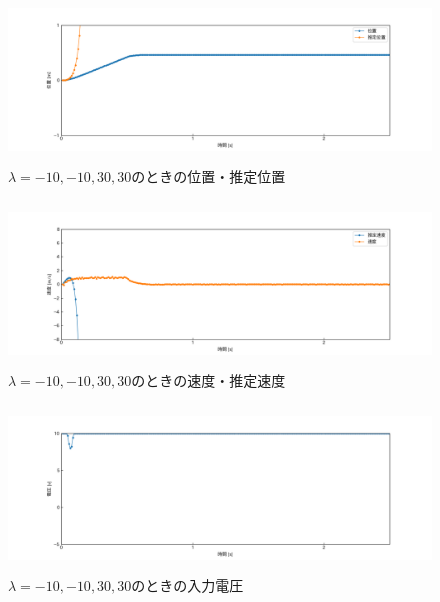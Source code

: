 \documentclass[12pt]{jsarticle}
\begin{document}
\begin{figure}[H]
  \begin{center}
    \includegraphics[clip,width=13.0cm, height=4.4cm]{../img/Exp9-1.png}
    \caption{$\lambda=-10, -10, 30, 30$のときの位置・推定位置}
    \label{Exp9-1}
  \end{center}
\end{figure}
\begin{figure}[H]
  \begin{center}
    \includegraphics[clip,width=13.0cm, height=4.4cm]{../img/Exp9-2.png}
    \caption{$\lambda=-10, -10, 30, 30$のときの速度・推定速度}
    \label{Exp9-2}
  \end{center}
\end{figure}
\begin{figure}[H]
  \begin{center}
    \includegraphics[clip,width=13.0cm, height=4.4cm]{../img/Exp9-3.png}
    \caption{$\lambda=-10, -10, 30, 30$のときの入力電圧}
    \label{Exp9-3}
  \end{center}
\end{figure}
\end{document}

